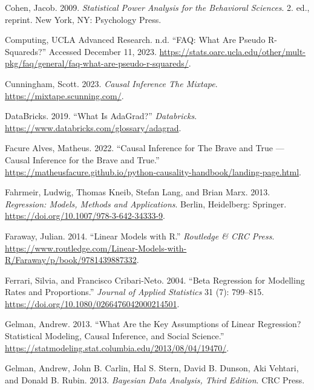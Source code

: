 \documentclass[
  letterpaper,
]{krantz}
\newlength{\cslhangindent}
\newenvironment{CSLReferences}[2] %
 {\begin{list}{}{%
  \setlength{\itemindent}{0pt}
  \setlength{\leftmargin}{0pt}
  \setlength{\parsep}{0pt}
  \ifodd #1
   \setlength{\leftmargin}{\cslhangindent}
   \setlength{\itemindent}{-1\cslhangindent}
  \fi
  \setlength{\itemsep}{#2\baselineskip}}}
 {\end{list}}
\begin{document}
\begin{CSLReferences}{1}{0}
Cohen, Jacob. 2009. \emph{Statistical Power Analysis for the Behavioral
Sciences}. 2. ed., reprint. New York, NY: Psychology Press.

Computing, UCLA Advanced Research. n.d. {``{FAQ}: {What} Are Pseudo
{R}-Squareds?''} Accessed December 11, 2023.
\url{https://stats.oarc.ucla.edu/other/mult-pkg/faq/general/faq-what-are-pseudo-r-squareds/}.

Cunningham, Scott. 2023. \emph{Causal {Inference} {The} {Mixtape}}.
\url{https://mixtape.scunning.com/}.

DataBricks. 2019. {``What Is {AdaGrad}?''} \emph{Databricks}.
\url{https://www.databricks.com/glossary/adagrad}.

Facure Alves, Matheus. 2022. {``Causal {Inference} for {The} {Brave} and
{True} --- {Causal} {Inference} for the {Brave} and {True}.''}
\url{https://matheusfacure.github.io/python-causality-handbook/landing-page.html}.

Fahrmeir, Ludwig, Thomas Kneib, Stefan Lang, and Brian Marx. 2013.
\emph{Regression: {Models}, {Methods} and {Applications}}. Berlin,
Heidelberg: Springer. \url{https://doi.org/10.1007/978-3-642-34333-9}.

Faraway, Julian. 2014. {``Linear {Models} with {R}.''} \emph{Routledge
\& CRC Press}.
\url{https://www.routledge.com/Linear-Models-with-R/Faraway/p/book/9781439887332}.

Ferrari, Silvia, and Francisco Cribari-Neto. 2004. {``Beta {Regression}
for {Modelling} {Rates} and {Proportions}.''} \emph{Journal of Applied
Statistics} 31 (7): 799--815.
\url{https://doi.org/10.1080/0266476042000214501}.

Gelman, Andrew. 2013. {``What Are the Key Assumptions of Linear
Regression? {\textbar} {Statistical} {Modeling}, {Causal} {Inference},
and {Social} {Science}.''}
\url{https://statmodeling.stat.columbia.edu/2013/08/04/19470/}.

Gelman, Andrew, John B. Carlin, Hal S. Stern, David B. Dunson, Aki
Vehtari, and Donald B. Rubin. 2013. \emph{Bayesian {Data} {Analysis},
{Third} {Edition}}. CRC Press.


\end{CSLReferences}
\end{document}
